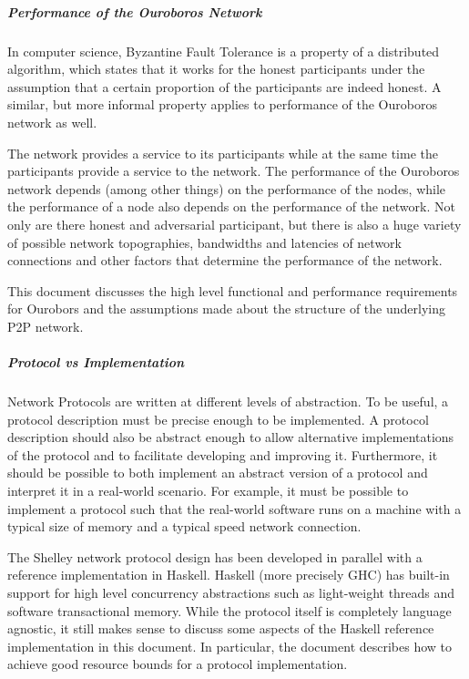 \documentclass{report}
\newcommand{\wip}[1]{}
\theoremstyle{definition}{
  \newtheorem{lemma}{Lemma}[section] %
  \newtheorem{definition}[lemma]{Definition}
}
\theoremstyle{theorem}{
  \newtheorem{invariant}[lemma]{Invariant}
  \newtheorem{proofobligation}[lemma]{Proof Obligation}
}
\numberwithin{equation}{lemma}
\begin{document}

\subparagraph{Performance of the Ouroboros Network}
In computer science, Byzantine Fault Tolerance is a property of a distributed algorithm, which states
that it works for the honest participants
under the assumption that a certain proportion of the participants are indeed honest.
A similar, but more informal property applies to performance of the Ouroboros network as well.

The network provides a service to its participants while at the same
time the participants provide a service to the network.
The performance of the Ouroboros network depends (among other things) on the performance of the nodes,
while the performance of a node also depends on the performance of the network.
Not only are there honest and adversarial participant, but there is also a huge variety of
possible network topographies, bandwidths and latencies of network connections and other
factors that determine the performance of the network.

This document discusses the high level functional and performance requirements for Ourobors and the
assumptions made about the structure of the underlying P2P network.

\subparagraph{Protocol vs Implementation}
Network Protocols are written at different levels of abstraction.
To be useful, a protocol description must be precise enough to be implemented.
A protocol description should also be abstract enough to allow alternative implementations of the protocol
and to facilitate developing and improving it.
Furthermore, it should be possible to both implement an
abstract version of a protocol
and interpret it in a real-world scenario.
For example, it must be possible to implement a protocol
such that the real-world software runs on a machine with a typical size of memory
and a typical speed network connection.

The Shelley network protocol design has been developed in parallel
with a reference implementation in Haskell.
Haskell (more precisely GHC) has built-in support for high level concurrency abstractions
such as light-weight threads and software transactional memory.
While the protocol itself is completely language agnostic, it still makes sense to discuss some
aspects of the Haskell reference implementation in this document.
In particular, the document describes how to achieve good resource bounds for
a protocol implementation.

\wip{
  \subparagraph{Threats}
  Reference the Threats section.
  'eclipse' can be deterred}
\end{document}
